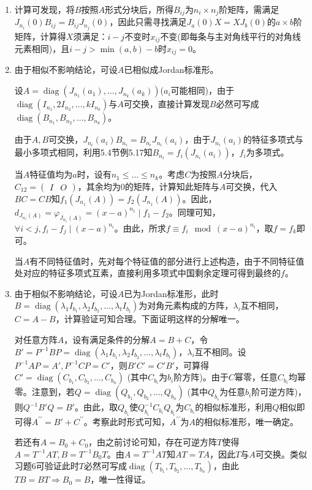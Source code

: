 \documentclass[a4paper,UTF8,fontset=windows]{ctexart}
\DeclareMathOperator{\diag}{diag}
\begin{document}
\begin{enumerate}
\item
计算可发现，将$B$按照$A$形式分块后，所得$B_{ij}$为$n_i\times n_j$阶矩阵，需满足$J_{n_i}(0)B_{ij}=B_{ij}J_{n_j}(0)$，因此只需寻找满足$J_a(0)X=XJ_b(0)$的$a\times b$阶矩阵，计算得$X$须满足：$i-j$不变时$x_{ij}$不变(即每条与主对角线平行的对角线元素相同)，且$i-j>\min(a,b)-b$时$x_{ij}=0$。

\item
由于相似不影响结论，可设$A$已相似成Jordan标准形。

设$A=\diag(J_{n_1}(a_1),\dots,J_{n_k}(a_k))$($a_i$可能相同)，由于$\diag(I_{n_1},2I_{n_2},\dots,kI_{n_k})$与$A$可交换，直接计算发现$B$必然可写成$\diag(B_{n_1},B_{n_2},\dots,B_{n_k})$。

由于$A,B$可交换，$J_{n_i}(a_i)B_{n_i}=B_{n_i}J_{n_i}(a_i)$，由于$J_{n_i}(a_i)$的特征多项式与最小多项式相同，利用5.4节例5.17知$B_{n_i}=f_i(J_{n_i}(a_i))$，$f_i$为多项式。

当$A$特征值均为$a$时，设有$n_1\le\dots\le n_k$。考虑$C$为按照$A$分块后，$C_{12}=\begin{pmatrix}I&O\end{pmatrix}$，其余均为0的矩阵，计算知此矩阵与$A$可交换，代入$BC=CB$知$f_1(J_{n_1}(A))=f_2(J_{n_1}(A))$。因此，$d_{J_{n_1}(A)}=\varphi_{J_{n_1}(A)}=(x-a)^{n_1}\mid f_1-f_2$。同理可知，$\forall i<j,f_i-f_j\mid (x-a)^{n_i}$。由此，所求$f\equiv f_i\mod(x-a)^{n_i}$，取$f=f_k$即可。

当$A$有不同特征值时，先对每个特征值的部分进行上述构造，由于不同特征值处对应的特征多项式互素，直接利用多项式中国剩余定理可得到最终的$f$。

\item
由于相似不影响结论，可设$A$已为Jordan标准形，此时$B=\diag(\lambda_1I_{b_1},\lambda_2I_{b_2},\dots,\lambda_tI_{b_t})$为对角元素构成的方阵，$\lambda_i$互不相同，$C=A-B$，计算验证可知合理。下面证明这样的分解唯一。

对任意方阵$A$，设有满足条件的分解$A=B+C$，令$B'=P^{-1}BP=\diag(\lambda_1I_{b_1},\lambda_2I_{b_2},\dots,\lambda_tI_{b_t})$，$\lambda_i$互不相同。设$P^{-1}AP=A',P^{-1}CP=C'$，则$B' C'=C' B'$，可算得$C'=\diag(C_{b_1},C_{b_2},\dots,C_{b_n})$ (其中$C_{b_i}$为$b_i$阶方阵)。由于$C$幂零，任意$C_{b_i}$均幂零。注意到，若$Q=\diag(Q_{b_1},Q_{b_2},\dots,Q_{b_n})$ (其中$Q_{b_i}$为任意$b_i$阶可逆方阵)，则$Q^{-1}B' Q=B'$。由此，取$Q_{b_i}$使$Q_{b_i}^{-1}C_{b_i}Q_{b_i}$为$C_{b_i}$的相似标准形，利用$Q$相似即可得$A^{\prime\prime}=B'+C^{\prime\prime}$。考察此时形式可知，$A^{\prime\prime}$为$A$的相似标准形，唯一确定。

若还有$A=B_0+C_0$，由之前讨论可知，存在可逆方阵$T$使得$A=T^{-1}AT,B=T^{-1}B_0T$。由$A=T^{-1}AT$知$AT=TA$，因此$T$与$A$可交换。类似习题6可验证此时$T$必然可写成$\diag(T_{b_1},T_{b_2},\dots,T_{b_n})$，由此$TB=BT\Rightarrow B_0=B$，唯一性得证。


\end{enumerate}
\end{document}
